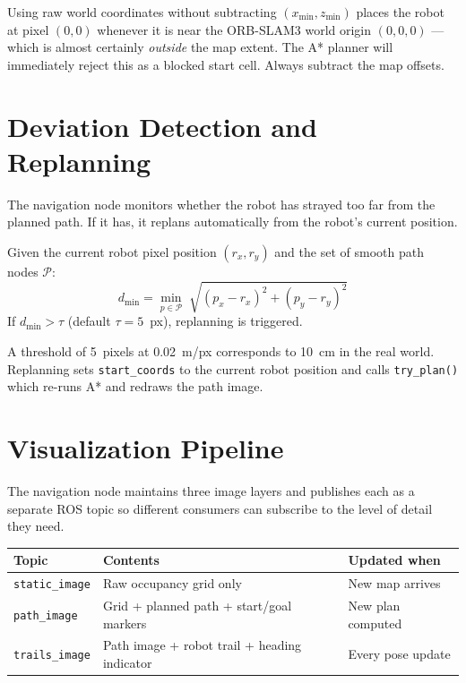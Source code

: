 \documentclass[12pt,a4paper]{article}
\begin{document}
\begin{tcolorbox}[warningbox, title={Common Mistake}]
  Using raw world coordinates without subtracting $(x_{\min}, z_{\min})$
  places the robot at pixel $(0,0)$ whenever it is near the ORB-SLAM3
  world origin $(0,0,0)$ --- which is almost certainly \emph{outside} the
  map extent. The A* planner will immediately reject this as a blocked
  start cell. Always subtract the map offsets.
\end{tcolorbox}

\section{Deviation Detection and Replanning}

The navigation node monitors whether the robot has strayed too far from the
planned path. If it has, it replans automatically from the robot's current
position.

\begin{tcolorbox}[formulabox, title={Deviation Check}]
Given the current robot pixel position $(r_x, r_y)$ and the set of smooth
path nodes $\mathcal{P}$:
\[
  d_{\min} = \min_{p \in \mathcal{P}}\; \sqrt{(p_x - r_x)^2 + (p_y - r_y)^2}
\]
If $d_{\min} > \tau$ (default $\tau = 5$~px), replanning is triggered.
\end{tcolorbox}

A threshold of 5~pixels at 0.02~m/px corresponds to 10~cm in the real world.
Replanning sets \texttt{start\_coords} to the current robot position and
calls \texttt{try\_plan()} which re-runs A* and redraws the path image.

\section{Visualization Pipeline}

The navigation node maintains three image layers and publishes each as a
separate ROS topic so different consumers can subscribe to the level of
detail they need.

\begin{center}
\begin{tabular}{lll}
\toprule
\textbf{Topic} & \textbf{Contents} & \textbf{Updated when} \\
\midrule
\texttt{static\_image}  & Raw occupancy grid only & New map arrives \\
\texttt{path\_image}    & Grid + planned path + start/goal markers & New plan computed \\
\texttt{trails\_image}  & Path image + robot trail + heading indicator & Every pose update \\
\bottomrule
\end{tabular}
\end{center}
\end{document}
